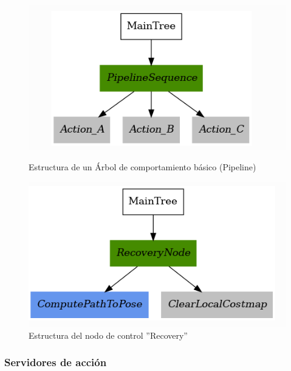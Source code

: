 \begin{figure}[htbp]
  \centering
  \begin{minipage}[b]{0.45\textwidth}
    \centering
    \includegraphics[width=\textwidth]{images/bt_sencillo.png}
    \caption{Estructura de un Árbol de comportamiento básico (Pipeline) \cite{nav2}}
    \label{fig:bt_sencillo}
  \end{minipage}
  \hfill
  \begin{minipage}[b]{0.45\textwidth}
    \centering
    \includegraphics[width=\textwidth]{images/recovery_bt.png}
    \caption{Estructura del nodo de control ''Recovery''}
    \label{fig:bt_recovery}
  \end{minipage}
\end{figure}
\newpage

\subsubsection{Servidores de acción}

